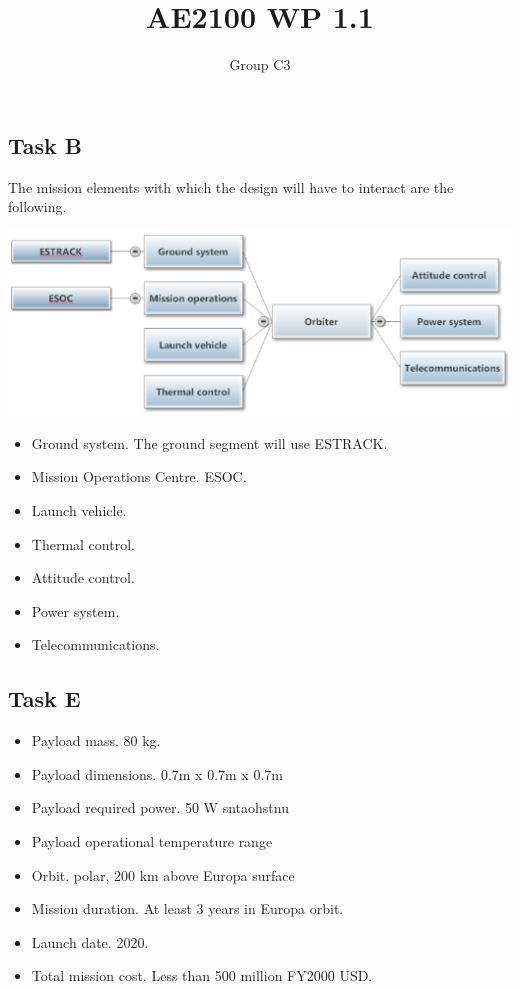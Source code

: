 \documentclass{article}
\title{AE2100 WP 1.1}
\author{Group C3}
\begin{document}
\maketitle
\subsection*{Task B}

The mission elements with which the design will have to interact are
the following.

\includegraphics[scale=.65]{block-diagram-WP1-1B.eps}

\begin{itemize}
\item{Ground system.} The ground segment will use ESTRACK.
\item{Mission Operations Centre.} ESOC.
\item{Launch vehicle.}
\item{Thermal control.}
\item{Attitude control.}
\item{Power system.}
\item{Telecommunications.}
\end{itemize}

\subsection*{Task E}
\begin{itemize}
  \item{Payload mass.} 80 \si{kg}.
  \item{Payload dimensions.} 0.7m x 0.7m x 0.7m
  \item{Payload required power.} 50 W sntaohstnu
  \item{Payload operational temperature range}
  \item{Orbit.} polar, 200 km above Europa surface
  \item{Mission duration.} At least 3 years in Europa orbit.
  \item{Launch date.} 2020.
  \item{Total mission cost.} Less than 500 million FY2000 USD.
\end{itemize}
\end{document}
